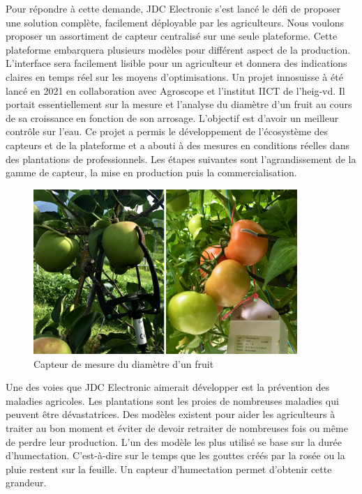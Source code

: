 \documentclass[a4paper, french, 10pt]{article} %
\begin{document}
Pour répondre à cette demande, JDC Electronic s'est lancé le défi de proposer une solution complète, facilement déployable par les agriculteurs. Nous voulons proposer un assortiment de capteur centralisé sur une seule plateforme. Cette plateforme embarquera plusieurs modèles pour différent aspect de la production. L'interface sera facilement lisible pour un agriculteur et donnera des indications claires en temps réel sur les moyens d’optimisations. Un projet innosuisse à été lancé en 2021 en collaboration avec Agroscope \cite{agro} et l'institut IICT de l'heig-vd. Il portait essentiellement sur la mesure et l'analyse du diamètre d'un fruit au cours de sa croissance en fonction de son arrosage. L'objectif est d'avoir un meilleur contrôle sur l'eau. Ce projet a permis le développement de l'écosystème des capteurs et de la plateforme et a abouti à des mesures en conditions réelles dans des plantations de professionnels. Les étapes suivantes sont l’agrandissement de la gamme de capteur, la mise en production puis la commercialisation.

\begin{figure}[!ht]
\centering
 \includegraphics[width=10cm]{smart-dendro-apfel-tomate}
 \caption{Capteur de mesure du diamètre d'un fruit}
\end{figure}


Une des voies que JDC Electronic aimerait développer est la prévention des maladies agricoles. Les plantations sont les proies de nombreuses maladies qui peuvent être dévastatrices. Des modèles existent pour aider les agriculteurs à traiter au bon moment et éviter de devoir retraiter de nombreuses fois ou même de perdre leur production. L'un des modèle les plus utilisé \cite{doi:10.1094/PDIS-05-14-0529-FE}  se base sur la durée d'humectation. C'est-à-dire sur le temps que les gouttes créés par la rosée ou la pluie restent sur la feuille. Un capteur d'humectation permet d'obtenir cette grandeur.
\end{document}
